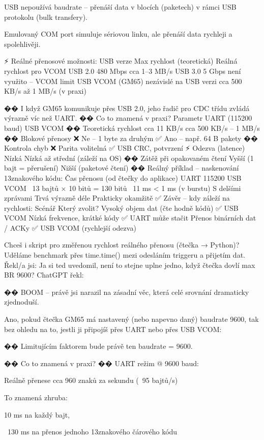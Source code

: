     USB nepoužívá baudrate – přenáší data v blocích (paketech) v rámci USB protokolu (bulk transfery).

    Emulovaný COM port simuluje sériovou linku, ale přenáší data rychleji a spolehlivěji.

⚡ Reálné přenosové možnosti:
USB verze	Max rychlost (teoretická)	Reálná rychlost pro VCOM
USB 2.0	480 Mbps	cca 1–3 MB/s
USB 3.0	5 Gbps	není využito – VCOM limit
USB VCOM (GM65)	nezávislé na USB verzi	cca 500 KB/s až 1 MB/s (v praxi)

�� I když GM65 komunikuje přes USB 2.0, jeho řadič pro CDC třídu zvládá výrazně víc než UART.
�� Co to znamená v praxi?
Parametr	UART (115200 baud)	USB VCOM
�� Teoretická rychlost	cca 11 KB/s	cca 500 KB/s – 1 MB/s
�� Blokové přenosy	❌ Ne – 1 byte za druhým	✅ Ano – např. 64 B pakety
�� Kontrola chyb	❌ Parita volitelná	✅ USB CRC, potvrzení
⚡ Odezva (latence)	Nízká	Nízká až střední (záleží na OS)
�� Zátěž při opakovaném čtení	Vyšší (1 bajt = přerušení)	Nižší (paketové čtení)
�� Reálný příklad – naskenování 13znakového kódu:
Čas přenosu (od čtečky do aplikace)	UART 115200	USB VCOM
~13 bajtů × 10 bitů = 130 bitů	~11 ms	< 1 ms (v burstu)
S delšími zprávami	Trvá výrazně déle	Prakticky okamžitě
✅ Závěr – kdy záleží na rychlosti:
Scénář	Který zvolit?
Vysoký objem dat (čte hodně kódů)	✅ USB VCOM
Nízká frekvence, krátké kódy	✅ UART může stačit
Přenos binárních dat / ACKy	✅ USB VCOM (rychlejší odezva)

Chceš i skript pro změřenou rychlost reálného přenosu (čtečka → Python)? Uděláme benchmark přes time.time() mezi odesláním triggeru a přijetím dat.
Řekl/a jsi:
Ja si ted uvedomil, není to stejne uplne jedno, když čtečka dovlí max BR 9600?
ChatGPT řekl:

�� BOOM – právě jsi narazil na zásadní věc, která celé srovnání dramaticky zjednoduší.

Ano, pokud čtečka GM65 má nastavený (nebo napevno daný) baudrate 9600, tak bez ohledu na to, jestli ji připojíš přes UART nebo přes USB VCOM:

    �� Limitujícím faktorem bude právě ten baudrate = 9600.

�� Co to znamená v praxi?
�� UART režim @ 9600 baud:

    Reálně přenese cca 960 znaků za sekundu (~95 bajtů/s)

    To znamená zhruba:

        10 ms na každý bajt,

        ~130 ms na přenos jednoho 13znakového čárového kódu

